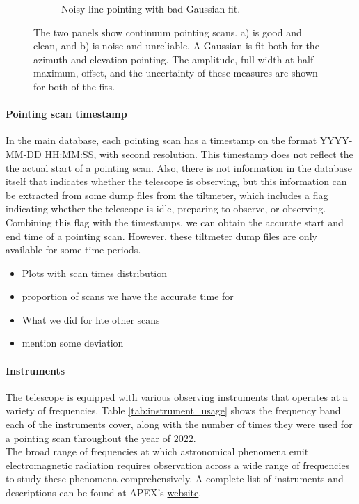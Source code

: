 \begin{figure}[H]
\begin{subfigure}[b]{0.75\textwidth}
         \caption{Noisy line pointing with bad Gaussian fit.}
         \label{subfig:bad_continuous}
     \end{subfigure}
    \caption{The two panels show continuum pointing scans. a) is good and clean, and b) is noise and unreliable. A Gaussian is fit both for the azimuth and elevation pointing. The amplitude, full width at half maximum, offset, and the uncertainty of these measures are shown for both of the fits.}
    \label{fig:continueous_pointings}
\end{figure}



\paragraph{Pointing scan timestamp} 
In the main database, each pointing scan has a timestamp on the format YYYY-MM-DD HH:MM:SS, with second resolution. This timestamp does not reflect the the actual start of a pointing scan. Also, there is not information in the database itself that indicates whether the telescope is observing, but this information can be extracted from some dump files from the tiltmeter, which includes a flag indicating whether the telescope is idle, preparing to observe, or observing. Combining this flag with the timestamps, we can obtain the accurate start and end time of a pointing scan. However, these tiltmeter dump files are only available for some time periods.

\begin{itemize}
    \item Plots with scan times distribution
    \item proportion of scans we have the accurate time for
    \item What we did for hte other scans
    \item mention some deviation
\end{itemize}

\paragraph{Instruments}
The telescope is equipped with various observing instruments that operates at a variety of frequencies.
Table \ref{tab:instrument_usage} shows the frequency band each of the instruments cover,
along with the number of times they were used for a pointing scan throughout the year of $2022$.\\

The broad range of frequencies at which astronomical phenomena emit electromagnetic radiation requires observation across a wide range of frequencies to study these phenomena comprehensively.
A complete list of instruments and descriptions can be found at APEX's \href{https://www.eso.org/sci/facilities/apex/cfp/cfp110/instrument_summary.html.html}{website}.

